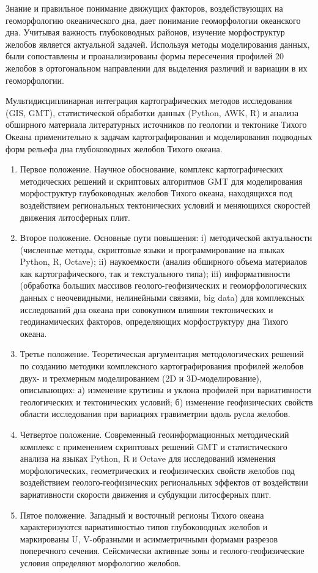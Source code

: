 Знание и правильное понимание движущих факторов, воздействующих на геоморфологию океанического дна, дает понимание геоморфологии океанского дна. Учитывая важность глубоководных районов, изучение морфоструктур желобов является актуальной задачей. Используя методы моделирования данных, были сопоставлены и проанализированы формы пересечения профилей 20 желобов в ортогональном направлении для выделения различий и вариации в их геоморфологии. 

{\methods} Мультидисциплинарная интеграция картографических методов исследования (GIS, GMT), статистической обработки данных (Python, AWK, R) и анализа обширного материала литературных источников по геологии и тектонике Тихого Океана применительно к задачам картографирования и моделирования подводных форм рельефа дна глубоководных желобов Тихого океана.

{}
\begin{enumerate}[label=\emph{\alph*})]
 	 \item Первое положение. Научное обоснование, комплекс картографических методических решений и скриптовых алгоритмов GMT для моделирования морфоструктур глубоководных желобов Тихого океана, находящихся под воздействием региональных тектонических условий и меняющихся скоростей движения литосферных плит.
  	\item Второе положение. Основные пути повышения: i) методической актуальности (численные методы, скриптовые языки и программирование на языках Python, R, Octave); ii)  наукоемкости (анализ обширного объема материалов как картографического, так и текстуального типа); iii) информативности (обработка больших массивов геолого-геофизических и геоморфологических данных с неочевидными, нелинейными связями, big data) для комплексных исследований дна океана при совокупном влиянии тектонических и геодинамических факторов, определяющих морфоструктуру дна Тихого океана.
 	 \item Третье положение. Теоретическая аргументация методологических решений по созданию методики комплексного картографирования профилей желобов двух- и трехмерным моделированием (2D и 3D-моделирование), описывающих: а) изменение крутизны и уклона профилей при вариативности геологических и тектонических условий; б) изменение геофизических свойств области исследования при вариациях гравиметрии вдоль русла желобов.
 	 \item Четвертое положение. Современный геоинформационных методический комплекс с применением скриптовых решений GMT и статистического анализа на языках Python, R и Octave для исследований изменения морфологических, геометрических и геофизических свойств желобов под воздействием геолого-геофизических региональных эффектов от воздействии вариативности скорости движения и субдукции литосферных плит.
  	 \item Пятое положение. Западный и восточный регионы Тихого океана характеризуются вариативностью типов глубоководных желобов и маркированы U, V-образными и асимметричными формами разрезов поперечного сечения. Сейсмически активные зоны и геолого-геофизические условия определяют морфологию желобов.
\end{enumerate}

